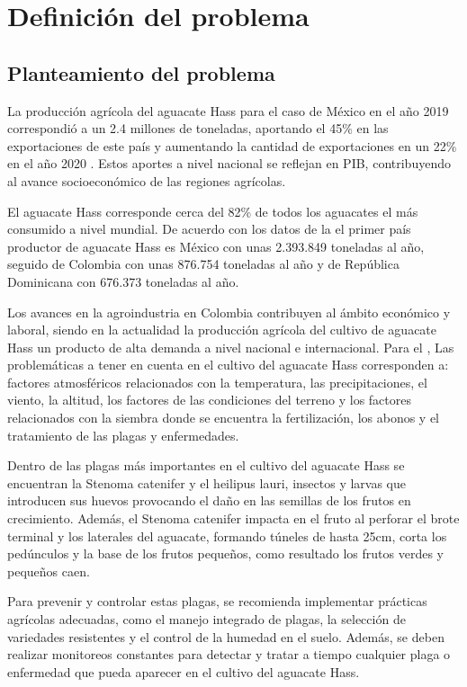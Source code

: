 \section{Definición del problema}

\subsection{Planteamiento del problema}
La producción agrícola del aguacate Hass para el caso de México en el año 2019 correspondió a un 2.4 millones de toneladas, aportando el 45\% en las exportaciones de este país y aumentando la cantidad de exportaciones en un 22\% en el año 2020 \citep{cruz2022competitividad}. Estos aportes a nivel nacional se reflejan en PIB, contribuyendo al avance socioeconómico de las regiones agrícolas.

El aguacate Hass corresponde cerca del 82\% de todos los aguacates el más consumido a nivel mundial. De acuerdo con los datos de la \citet{faostat2021hacia} el primer país productor de aguacate Hass es México con unas 2.393.849 toneladas al año, seguido de Colombia con unas 876.754 toneladas al año y de República Dominicana con 676.373 toneladas al año.

Los avances en la agroindustria en Colombia contribuyen al ámbito económico y laboral, siendo en la actualidad la producción agrícola del cultivo de aguacate Hass un producto de alta demanda a nivel nacional e internacional. Para el \citet{dane2016cultivo}, Las problemáticas a tener en cuenta en el cultivo del aguacate Hass corresponden a: factores atmosféricos relacionados con la temperatura, las precipitaciones, el viento, la altitud, los factores de las condiciones del terreno y los factores relacionados con la siembra donde se encuentra la fertilización, los abonos y el tratamiento de las plagas y enfermedades.

Dentro de las plagas más importantes en el cultivo del aguacate Hass se encuentran la Stenoma catenifer y el heilipus lauri, insectos y larvas que introducen sus huevos provocando el daño en las semillas de los frutos en crecimiento. Además, el Stenoma catenifer impacta en el fruto al perforar el brote terminal y los laterales del aguacate, formando túneles de hasta 25cm, corta los pedúnculos y la base de los frutos pequeños, como resultado los frutos verdes y pequeños caen.

Para prevenir y controlar estas plagas, se recomienda implementar prácticas agrícolas adecuadas, como el manejo integrado de plagas, la selección de variedades resistentes y el control de la humedad en el suelo. Además, se deben realizar monitoreos constantes para detectar y tratar a tiempo cualquier plaga o enfermedad que pueda aparecer en el cultivo del aguacate Hass.

